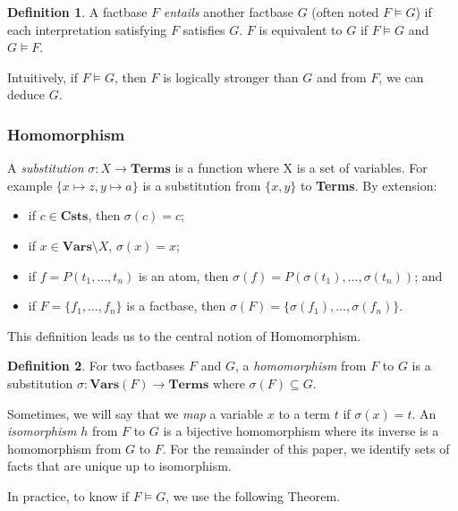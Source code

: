 \documentclass{article}
\theoremstyle{definition}
\newtheorem{definition}{Definition}[section]
\theoremstyle{remark}
\newtheorem{remark}{Remark}[section]
\newcommand{\Vars}{\textbf{Vars}}
\newcommand{\Terms}{\textbf{Terms}}
\newcommand{\Csts}{\textbf{Csts}}
\begin{document}
\begin{definition}
A factbase $F$ \emph{entails} another factbase $G$ (often noted $F \models G$) if each interpretation satisfying $F$ satisfies $G$. $F$ is equivalent to $G$ if $F \models G$ and $G \models F$.
\end{definition}

Intuitively, if $F \models G$, then $F$ is logically stronger than $G$ and from $F$, we can deduce $G$.

\subsubsection{Homomorphism}

A \emph{substitution} $\sigma:X \to \Terms$ is a function where X is a set of variables. For example $\{x \mapsto z, y \mapsto a \}$ is a substitution from $\{x,y\}$ to \Terms. By extension: 
\begin{itemize}
\item if $c \in \Csts$, then $\sigma(c) = c$;
\item if $x \in \Vars \setminus X$, $\sigma(x) = x$;
\item if $f = P(t_1,\ldots,t_n)$ is an atom, then $\sigma(f) = P(\sigma(t_1),\ldots,\sigma(t_n))$; and
\item if $F = \{f_1,\ldots,f_n\}$ is a factbase, then $\sigma(F) = \{\sigma(f_1),\ldots,\sigma(f_n)\}$.
\end{itemize}

This definition leads us to the central notion of Homomorphism.

\begin{definition}
For two factbases $F$ and $G$, a \emph{homomorphism} from $F$ to $G$ is a substitution $\sigma:\Vars(F) \to \Terms$ where $\sigma(F) \subseteq G$. 
\end{definition}

Sometimes, we will say that we \emph{map} a variable $x$ to a term $t$ if $\sigma(x)=t$. An \emph{isomorphism} $h$ from $F$ to $G$ is a bijective homomorphism where its inverse is a homomorphism from $G$ to $F$. For the remainder of this paper, we identify sets of facts that are unique up to isomorphism. 

In practice, to know if $F \models G$, we use the following Theorem.

\end{document}
